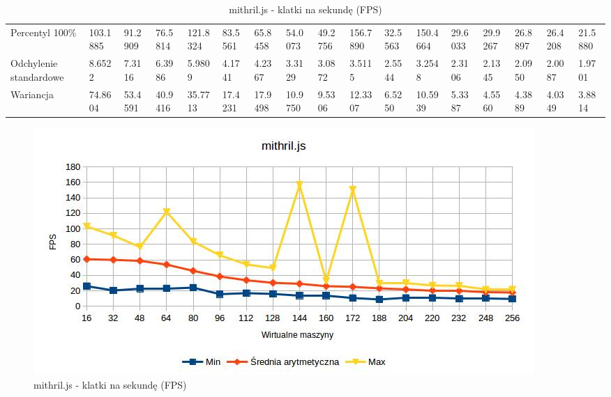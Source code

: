 \documentclass[polish, twoside, 12pt]{mwart}
\begin{document}
\begin{table}[]
{\begin{tabular}{@{}lllllllllllllllll@{}}
  Percentyl 100\%        & 103.1885 & 91.2909 & 76.5814 & 121.8324 & 83.5561 & 65.8458 & 54.0073 & 49.2756 & 156.7890 & 32.5563 & 150.4664 & 29.6033 & 29.9267 & 26.8897 & 26.4208 & 21.5880 \\
  Odchylenie standardowe & 8.6522   & 7.3116  & 6.3986  & 5.9809   & 4.1741  & 4.2367  & 3.3129  & 3.0872  & 3.5115   & 2.5544  & 3.2548   & 2.3106  & 2.1345  & 2.0950  & 2.0087  & 1.9701  \\
  Wariancja              & 74.8604  & 53.4591 & 40.9416 & 35.7713  & 17.4231 & 17.9498 & 10.9750 & 9.5306  & 12.3307  & 6.5250  & 10.5939  & 5.3387  & 4.5560  & 4.3889  & 4.0349  & 3.8814  \\ \bottomrule
  \end{tabular}%
  }
  \caption{mithril.js - klatki na sekundę (FPS)}
  \label{tab:mithril-fps}
\end{table}

\begin{figure}[ht]
  \includegraphics[width=\textwidth]{mithril-fps.jpg}
  \caption{mithril.js - klatki na sekundę (FPS)}
  \label{fig:mithril-fps}
\end{figure}
\end{document}
